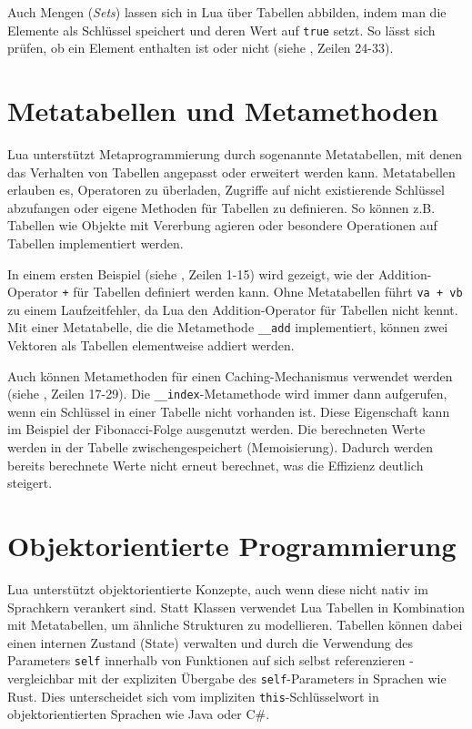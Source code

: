 \documentclass[11pt,a4paper]{article}
\begin{document}
Auch Mengen (\textit{Sets}) lassen sich in Lua über Tabellen abbilden, indem man die Elemente als Schlüssel speichert und deren Wert auf \lstinline|true| setzt.
So lässt sich prüfen, ob ein Element enthalten ist oder nicht (siehe , Zeilen 24-33).

\section*{Metatabellen und Metamethoden}

Lua unterstützt Metaprogrammierung durch sogenannte Metatabellen, mit denen das Verhalten von Tabellen angepasst oder erweitert werden kann.
Metatabellen erlauben es, Operatoren zu überladen, Zugriffe auf nicht existierende Schlüssel abzufangen oder eigene Methoden für Tabellen zu definieren.
So können z.B. Tabellen wie Objekte mit Vererbung agieren oder besondere Operationen auf Tabellen implementiert werden.

In einem ersten Beispiel (siehe , Zeilen 1-15) wird gezeigt, wie der Addition-Operator \colorbox{codegray}{\lstinline|+|} für Tabellen definiert werden kann.
Ohne Metatabellen führt \colorbox{codegray}{\lstinline|va + vb|} zu einem Laufzeitfehler, da Lua den Addition-Operator für Tabellen nicht kennt.
Mit einer Metatabelle, die die Metamethode \lstinline|__add| implementiert, können zwei Vektoren als Tabellen elementweise addiert werden.

Auch können Metamethoden für einen Caching-Mechanismus verwendet werden (siehe , Zeilen 17-29).
Die \lstinline|__index|-Metamethode wird immer dann aufgerufen, wenn ein Schlüssel in einer Tabelle nicht vorhanden ist.
Diese Eigenschaft kann im Beispiel der Fibonacci-Folge ausgenutzt werden. Die berechneten Werte werden in der Tabelle zwischengespeichert (Memoisierung).
Dadurch werden bereits berechnete Werte nicht erneut berechnet, was die Effizienz deutlich steigert.

\section*{Objektorientierte Programmierung}

Lua unterstützt objektorientierte Konzepte, auch wenn diese nicht nativ im Sprachkern verankert sind.
Statt Klassen verwendet Lua Tabellen in Kombination mit Metatabellen, um ähnliche Strukturen zu modellieren.
Tabellen können dabei einen internen Zustand (State) verwalten und durch die Verwendung des Parameters \texttt{self}
innerhalb von Funktionen auf sich selbst referenzieren - vergleichbar mit der expliziten Übergabe des \texttt{self}-Parameters in Sprachen wie Rust.
Dies unterscheidet sich vom impliziten \texttt{this}-Schlüsselwort in objektorientierten Sprachen wie Java oder C\#.
\end{document}
